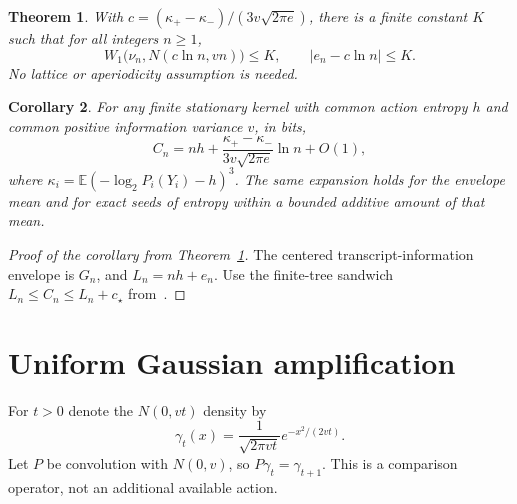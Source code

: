 \documentclass[11pt]{article}
\newtheorem{theorem}{Theorem}
\newtheorem{corollary}[theorem]{Corollary}
\newcommand{\E}{\mathbb E}
\begin{document}
\begin{theorem}\label{thm:main}
With $c=(\kappa_+-\kappa_-)/(3v\sqrt{2\pi e})$, there is a finite
constant $K$ such that for all integers $n\ge1$,
\begin{equation}\label{eq:main}
 \boxed{W_1\bigl(\nu_n,N(c\ln n,vn)\bigr)\le K,
 \qquad |e_n-c\ln n|\le K.}
\end{equation}
No lattice or aperiodicity assumption is needed.
\end{theorem}

\begin{corollary}\label{cor:cost}
For any finite stationary kernel with common action entropy $h$ and
common positive information variance $v$, in bits,
\[
 \boxed{C_n=nh+\frac{\kappa_+-\kappa_-}{3v\sqrt{2\pi e}}\ln n+O(1),}
\]
where $\kappa_i=\E(-\log_2P_i(Y_i)-h)^3$. The same expansion holds
for the envelope mean and for exact seeds of entropy within a bounded
additive amount of that mean.
\end{corollary}
\begin{proof}[Proof of the corollary from Theorem~\ref{thm:main}]
The centered transcript-information envelope is $G_n$, and
$L_n=nh+e_n$. Use the finite-tree sandwich
$L_n\le C_n\le L_n+c_\star$ from~\cite{repo}.
\end{proof}

\section{Uniform Gaussian amplification}
For $t>0$ denote the $N(0,vt)$ density by
\[
 \gamma_t(x)=\frac{1}{\sqrt{2\pi vt}}e^{-x^2/(2vt)}.
\]
Let $P$ be convolution with $N(0,v)$, so $P\gamma_t=\gamma_{t+1}$.
This is a comparison operator, not an additional available action.
\end{document}
